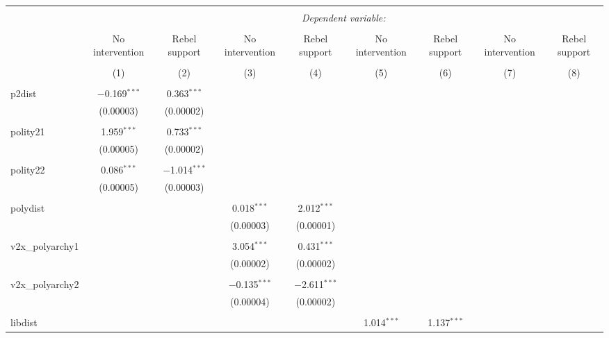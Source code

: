 
\begin{table}[!htbp] \centering 
  \caption{} 
  \label{} 
\begin{tabular}{@{\extracolsep{5pt}}lcccccccc} 
\\[-1.8ex]\hline 
\hline \\[-1.8ex] 
 & \multicolumn{8}{c}{\textit{Dependent variable:}} \\ 
\cline{2-9} 
\\[-1.8ex] & No intervention & Rebel support & No intervention & Rebel support & No intervention & Rebel support & No intervention & Rebel support \\ 
\\[-1.8ex] & (1) & (2) & (3) & (4) & (5) & (6) & (7) & (8)\\ 
\hline \\[-1.8ex] 
 p2dist & $-$0.169$^{***}$ & 0.363$^{***}$ &  &  &  &  &  &  \\ 
  & (0.00003) & (0.00002) &  &  &  &  &  &  \\ 
  & & & & & & & & \\ 
 polity21 & 1.959$^{***}$ & 0.733$^{***}$ &  &  &  &  &  &  \\ 
  & (0.00005) & (0.00002) &  &  &  &  &  &  \\ 
  & & & & & & & & \\ 
 polity22 & 0.086$^{***}$ & $-$1.014$^{***}$ &  &  &  &  &  &  \\ 
  & (0.00005) & (0.00003) &  &  &  &  &  &  \\ 
  & & & & & & & & \\ 
 polydist &  &  & 0.018$^{***}$ & 2.012$^{***}$ &  &  &  &  \\ 
  &  &  & (0.00003) & (0.00001) &  &  &  &  \\ 
  & & & & & & & & \\ 
 v2x\_polyarchy1 &  &  & 3.054$^{***}$ & 0.431$^{***}$ &  &  &  &  \\ 
  &  &  & (0.00002) & (0.00002) &  &  &  &  \\ 
  & & & & & & & & \\ 
 v2x\_polyarchy2 &  &  & $-$0.135$^{***}$ & $-$2.611$^{***}$ &  &  &  &  \\ 
  &  &  & (0.00004) & (0.00002) &  &  &  &  \\ 
  & & & & & & & & \\ 
 libdist &  &  &  &  & 1.014$^{***}$ & 1.137$^{***}$ &  &  \\ 

\end{tabular}
\end{table}
